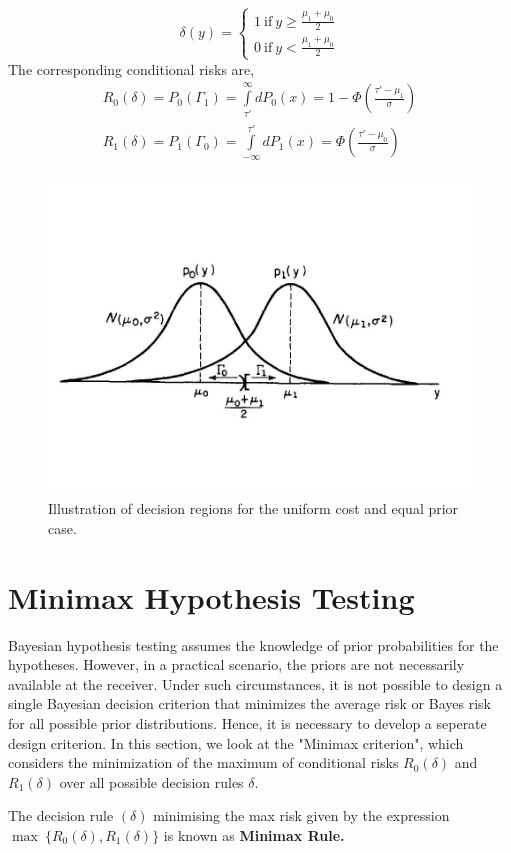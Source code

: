 \documentclass[a4paper,english,12pt]{article}
\begin{document}
\begin{exmp}
\begin{equation}
\delta(y)= \begin{cases}
1 ~ \mbox{if}~  y \ge \frac{{{\mu_1} + {\mu_0}}}{2}\\
0 ~ \mbox{if}~ y < \frac{{{\mu_1} + {\mu_0}}}{2}
\end{cases}
\end{equation}
The corresponding conditional risks are,
\begin{eqnarray}\nonumber
R_0(\delta)= P_0(\Gamma_1)
=\int\limits_{{\tau'}}^\infty  {d{P_0}(x)}
=1 - \Phi \left(\frac{{\tau'-\mu_1}}{\sigma }\right)\\
R_1(\delta)= P_1(\Gamma_0)
=\int\limits_{-\infty}^{\tau'}  {d{P_1}(x)}
=\Phi \left(\frac{{\tau'-\mu_0}}{\sigma }\right)
\end{eqnarray}
\begin{figure}[h]
\centering
\includegraphics[trim={0 5cm 0 7cm}, width=0.9\linewidth]{Figures/gaussian_error}
\caption{Illustration of decision regions for the uniform cost and equal prior case.}
\label{fig:gaussianerror}
\end{figure}
\end{exmp}
\section{Minimax Hypothesis Testing}
Bayesian hypothesis testing assumes the knowledge of prior probabilities for the hypotheses. However, in a practical scenario, the priors are not necessarily available at the receiver. Under such circumstances, it is not possible to design a single Bayesian decision criterion that minimizes the average risk or Bayes risk for all possible prior distributions. Hence, it is necessary to develop a seperate design criterion. In this section, we look at the "Minimax criterion", which considers the minimization of the maximum of conditional risks $R_0(\delta)$ and $R_1(\delta)$ over all possible decision rules $\delta$. 
\begin{defn}
The decision rule $(\delta)$ minimising the max risk given by the expression $\max~\{R_0(\delta),R_1(\delta)\}$ is known as \textbf{Minimax Rule.}
\end{defn}
\end{document}
